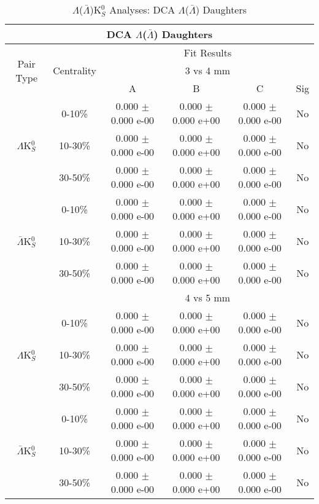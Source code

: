 \documentclass[../AnalysisNoteJBuxton.tex]{subfiles}
\begin{document}
\begin{table}
 \centering
 \begin{tabular}{|c|c|c|c|c|c|}
  \multicolumn{6}{c}{DCA $\Lambda$($\bar{\Lambda}$) Daughters} \\
  \hline
  \multirow{3}{*}{Pair Type} & \multirow{3}{*}{Centrality} & \multicolumn{4}{c|}{Fit Results} \\
  \cline{3-6}
   & & \multicolumn{4}{c|}{3 vs 4 mm} \\
  \cline{3-6}
   & & A & B & C & Sig \\
  \hline  
  \multirow{3}{*}{$\Lambda$K$^{0}_{S}$}
   &  0-10\% & 0.000 $\pm$ 0.000 e-00 & 0.000 $\pm$ 0.000 e+00 & 0.000 $\pm$ 0.000 e-00 & No \\
   & 10-30\% & 0.000 $\pm$ 0.000 e-00 & 0.000 $\pm$ 0.000 e+00 & 0.000 $\pm$ 0.000 e-00 & No \\
   & 30-50\% & 0.000 $\pm$ 0.000 e-00 & 0.000 $\pm$ 0.000 e+00 & 0.000 $\pm$ 0.000 e-00 & No \\
  \hline
  \multirow{3}{*}{$\bar{\Lambda}$K$^{0}_{S}$}  
   &  0-10\% & 0.000 $\pm$ 0.000 e-00 & 0.000 $\pm$ 0.000 e+00 & 0.000 $\pm$ 0.000 e-00 & No \\
   & 10-30\% & 0.000 $\pm$ 0.000 e-00 & 0.000 $\pm$ 0.000 e+00 & 0.000 $\pm$ 0.000 e-00 & No \\
   & 30-50\% & 0.000 $\pm$ 0.000 e-00 & 0.000 $\pm$ 0.000 e+00 & 0.000 $\pm$ 0.000 e-00 & No \\
  \hline 
  \multicolumn{2}{|c|}{} & \multicolumn{4}{c|}{4 vs 5 mm} \\
  \hline  
  \multirow{3}{*}{$\Lambda$K$^{0}_{S}$}   
   &  0-10\% & 0.000 $\pm$ 0.000 e-00 & 0.000 $\pm$ 0.000 e+00 & 0.000 $\pm$ 0.000 e-00 & No \\
   & 10-30\% & 0.000 $\pm$ 0.000 e-00 & 0.000 $\pm$ 0.000 e+00 & 0.000 $\pm$ 0.000 e-00 & No \\
   & 30-50\% & 0.000 $\pm$ 0.000 e-00 & 0.000 $\pm$ 0.000 e+00 & 0.000 $\pm$ 0.000 e-00 & No \\
  \hline  
  \multirow{3}{*}{$\bar{\Lambda}$K$^{0}_{S}$}
   &  0-10\% & 0.000 $\pm$ 0.000 e-00 & 0.000 $\pm$ 0.000 e+00 & 0.000 $\pm$ 0.000 e-00 & No \\
   & 10-30\% & 0.000 $\pm$ 0.000 e-00 & 0.000 $\pm$ 0.000 e+00 & 0.000 $\pm$ 0.000 e-00 & No \\
   & 30-50\% & 0.000 $\pm$ 0.000 e-00 & 0.000 $\pm$ 0.000 e+00 & 0.000 $\pm$ 0.000 e-00 & No \\
  \hline
 \end{tabular}
 \caption{$\Lambda$($\bar{\Lambda}$)K$^{0}_{S}$ Analyses: DCA $\Lambda$($\bar{\Lambda}$) Daughters}
 \label{tab:LamDaughtersDcaLamK0Full}
\end{table}
\end{document}
